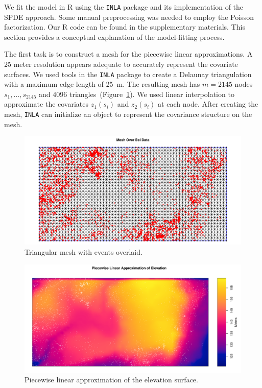 \documentclass[]{interact}
\begin{document}
We fit the model in R using the \texttt{INLA} package and its implementation of
the SPDE approach. Some manual preprocessing was needed to employ the Poisson
factorization. Our R code can be found in the supplementary materials. This
section provides a conceptual explanation of the model-fitting process.

The first task is to construct a mesh for the
piecewise linear approximations. A 25 meter resolution appears adequate to
accurately represent the covariate surfaces. We used tools in the \texttt{INLA}
package to create a Delaunay triangulation with a maximum edge length of 25~m.
The resulting mesh has \(m = 2145\) nodes \(s_{1},  \dots, s_{2145}\) and 4096
triangles~(Figure~\ref{beimesh}). We used linear interpolation to approximate
the covariates \(z_{1}(s_{i})\) and \(z_{2}(s_{i})\) at each node. After
creating the mesh, \texttt{INLA} can initialize an object to represent the
covariance structure on the mesh.

\begin{figure}[h]
\includegraphics[width=\textwidth]{figures/bei_mesh.pdf}
\caption{Triangular mesh with events overlaid.}
\label{beimesh}
\end{figure}

\begin{figure}[h]
\includegraphics[width=\textwidth]{figures/bei_elev_mesh.pdf}
\caption{Piecewise linear approximation of the elevation surface.}
\label{beielevmesh}
\end{figure}
\end{document}
